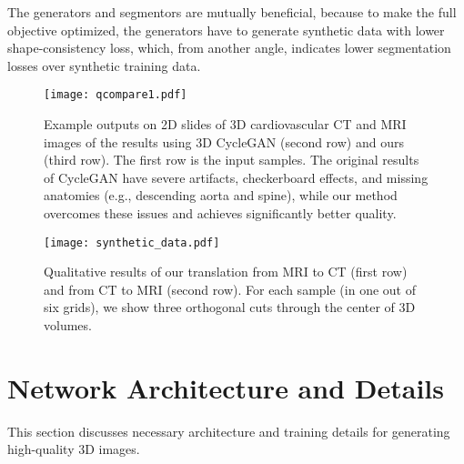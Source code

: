 \documentclass[10pt,twocolumn,letterpaper]{article}
\begin{document}
The generators and segmentors are mutually beneficial, because to make the full objective optimized, the generators have to generate synthetic data with lower shape-consistency loss, which, from another angle, indicates lower segmentation losses over synthetic training data.  

\begin{figure}[t]
	\begin{center}
		\texttt{[image: qcompare1.pdf]}
	\end{center}
	\vspace{-.2cm}
	\caption{Example outputs on 2D slides of 3D cardiovascular CT and MRI images of the results using 3D CycleGAN (second row) and ours (third row). The first row is the input samples.
	The original results of CycleGAN have severe artifacts, checkerboard effects, and missing anatomies (e.g., descending aorta and spine), while our method overcomes these issues and achieves significantly better quality.} \label{fig:qcomare1}
\end{figure}

\begin{figure*}[t]
	\begin{center}
		\texttt{[image: synthetic\_data.pdf]}
	\end{center}
	\vspace{-.4cm}
	\caption{Qualitative results of our translation from MRI to CT (first row) and from CT to MRI (second row). For each sample (in one out of six grids), we show three orthogonal cuts through the center of 3D volumes. } \label{fig:synthetic_data} 
\end{figure*}

\section{Network Architecture and Details}
This section discusses necessary architecture and training details for generating high-quality 3D images.
\end{document}
